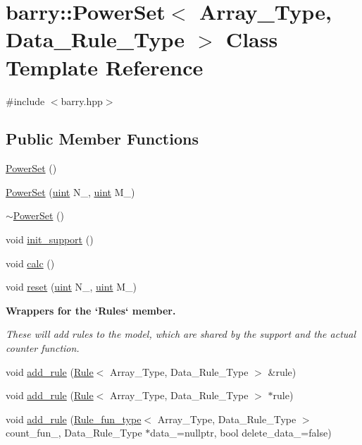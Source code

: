 \hypertarget{classbarry_1_1_power_set}{}\section{barry\+:\+:Power\+Set$<$ Array\+\_\+\+Type, Data\+\_\+\+Rule\+\_\+\+Type $>$ Class Template Reference}
\label{classbarry_1_1_power_set}


{\ttfamily \#include $<$barry.\+hpp$>$}

\subsection*{Public Member Functions}
\begin{DoxyCompactItemize}
\item 
\hyperlink{classbarry_1_1_power_set_ab2fa4e40323bb9225225bb52b86ff345}{Power\+Set} ()
\item 
\hyperlink{classbarry_1_1_power_set_a96a31964644ea81991fe103a2a8bfb1f}{Power\+Set} (\hyperlink{namespacebarry_a11dfc53ddb4672278319aa04f1e09a6c}{uint} N\+\_\+, \hyperlink{namespacebarry_a11dfc53ddb4672278319aa04f1e09a6c}{uint} M\+\_\+)
\item 
\hyperlink{classbarry_1_1_power_set_a89a176c9517e81a066adffad3c46aba5}{$\sim$\+Power\+Set} ()
\item 
void \hyperlink{classbarry_1_1_power_set_a8eefc9606c6339938a8d9adcd0d7e153}{init\+\_\+support} ()
\item 
void \hyperlink{classbarry_1_1_power_set_ad3b707294498105b2cc1a04017cc96d2}{calc} ()
\item 
void \hyperlink{classbarry_1_1_power_set_aba11dd8802cd2eb529c7c30b55994248}{reset} (\hyperlink{namespacebarry_a11dfc53ddb4672278319aa04f1e09a6c}{uint} N\+\_\+, \hyperlink{namespacebarry_a11dfc53ddb4672278319aa04f1e09a6c}{uint} M\+\_\+)
\end{DoxyCompactItemize}
\begin{Indent}\textbf{ Wrappers for the `\+Rules` member.}\par
{\em These will add rules to the model, which are shared by the support and the actual counter function. }\begin{DoxyCompactItemize}
\item 
void \hyperlink{classbarry_1_1_power_set_a00ee318a40da91bcf0bff79bf71454ab}{add\+\_\+rule} (\hyperlink{classbarry_1_1_rule}{Rule}$<$ Array\+\_\+\+Type, Data\+\_\+\+Rule\+\_\+\+Type $>$ \&rule)
\item 
void \hyperlink{classbarry_1_1_power_set_a6cb8fb8f09b4c190e2ac6c07daa1241e}{add\+\_\+rule} (\hyperlink{classbarry_1_1_rule}{Rule}$<$ Array\+\_\+\+Type, Data\+\_\+\+Rule\+\_\+\+Type $>$ $\ast$rule)
\item 
void \hyperlink{classbarry_1_1_power_set_aae5eae12186fff037efa3884ac2b3dcc}{add\+\_\+rule} (\hyperlink{namespacebarry_aefd7e6d4ba228e2ce1074d075c512178}{Rule\+\_\+fun\+\_\+type}$<$ Array\+\_\+\+Type, Data\+\_\+\+Rule\+\_\+\+Type $>$ count\+\_\+fun\+\_\+, Data\+\_\+\+Rule\+\_\+\+Type $\ast$data\+\_\+=nullptr, bool delete\+\_\+data\+\_\+=false)
\end{DoxyCompactItemize}
\end{Indent}
